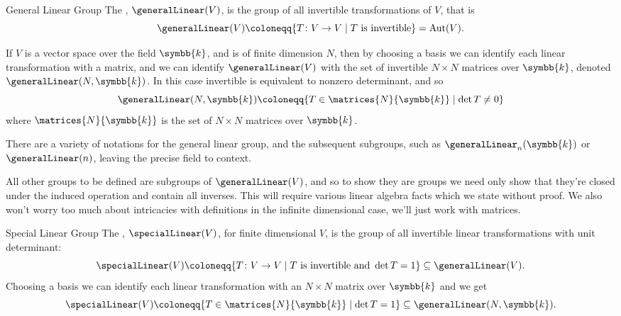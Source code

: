 \documentclass[fleqn]{NotesClass}
\newcommand{\subgroup}{\subseteq}
\renewcommand{\field}{\symbb{k}}
\DeclareMathOperator{\Aut}{Aut}
\begin{document}
    \begin{dfn}{General Linear Group}{}
        The , \(\generalLinear(V)\), is the group of all invertible transformations of \(V\), that is
        \begin{equation}
            \generalLinear(V) \coloneqq \{T \colon V \to V \mid T \text{ is invertible}\} = \Aut(V).
        \end{equation}
        
        If \(V\) is a vector space over the field \(\field\), and is of finite dimension \(N\), then by choosing a basis we can identify each linear transformation with a matrix, and we can identify \(\generalLinear(V)\) with the set of invertible \(N \times N\) matrices over \(\field\), denoted \(\generalLinear(N, \field)\).
        In this case invertible is equivalent to nonzero determinant, and so
        \begin{equation}
            \generalLinear(N, \field) \coloneqq \{T \in \matrices{N}{\field} \mid \det T \ne 0\}
        \end{equation}
        where \(\matrices{N}{\field}\) is the set of \(N \times N\) matrices over \(\field\).
    \end{dfn}
    
    There are a variety of notations for the general linear group, and the subsequent subgroups, such as \(\generalLinear_n(\field)\) or \(\generalLinear(n)\), leaving the precise field to context.
    
    All other groups to be defined are subgroups of \(\generalLinear(V)\), and so to show they are groups we need only show that they're closed under the induced operation and contain all inverses.
    This will require various linear algebra facts which we state without proof.
    We also won't worry too much about intricacies with definitions in the infinite dimensional case, we'll just work with matrices.
    
    \begin{dfn}{Special Linear Group}{}
        The , \(\specialLinear(V)\), for finite dimensional \(V\), is the group of all invertible linear transformations with unit determinant:
        \begin{equation}
            \specialLinear(V) \coloneqq \{T \colon V \to V \mid T \text{ is invertible and } \det T = 1\} \subgroup \generalLinear(V).
        \end{equation}
        Choosing a basis we can identify each linear transformation with an \(N \times N\) matrix over \(\field\) and we get
        \begin{equation}
            \specialLinear(V) \coloneqq \{T \in \matrices{N}{\field} \mid \det T = 1\} \subgroup \generalLinear(N, \field).
        \end{equation}
    \end{dfn}
    
\end{document}
